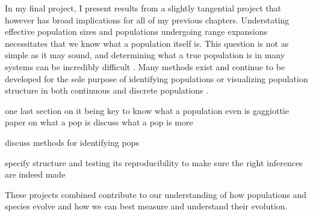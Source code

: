 In my final project,  I present results from a slightly tangential project that however has broad implications for all of my previous chapters. Understating effective population sizes and populations undergoing range expansions necessitates that we know what a population itself is. This question is not as simple as it may sound, and determining what a true population is in many systems can be incredibly difficult \citep{Waples:2006}. Many methods exist and continue to be developed for the sole purpose of identifying populations or visualizing population structure in both continuous and discrete populations \citep{Pritchard:2000, Falush:2003, Falush:2007, Rosenberg:2004, Petkova:2015, Bradburd:2016}.


one last section on it being key to know what a population even is
gaggiottie paper on what a pop is
discuss what a pop is more

discuss methods for identifying pops

specify structure and testing its reproducibility to make sure the right inferences are indeed made



These projects combined contribute to our understanding of how populations and species evolve and how we can best measure and understand their evolution.







